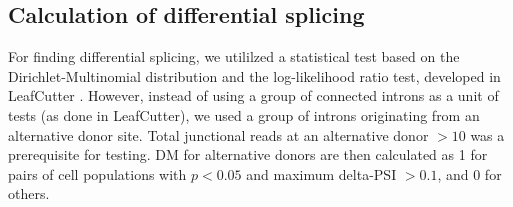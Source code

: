 
\subsection{Calculation of differential splicing}
For finding differential splicing, we utililzed a statistical test based on the Dirichlet-Multinomial distribution and the log-likelihood ratio test, developed in LeafCutter \citep{Li_2016}. However, instead of using a group of connected introns as a unit of tests (as done in LeafCutter), we used a group of introns originating from an alternative donor site. Total junctional reads at an alternative donor $> 10$ was a prerequisite for testing. DM for alternative donors are then calculated as 1 for pairs of cell populations with $p < 0.05$ and maximum delta-PSI $> 0.1$, and 0 for others. 


